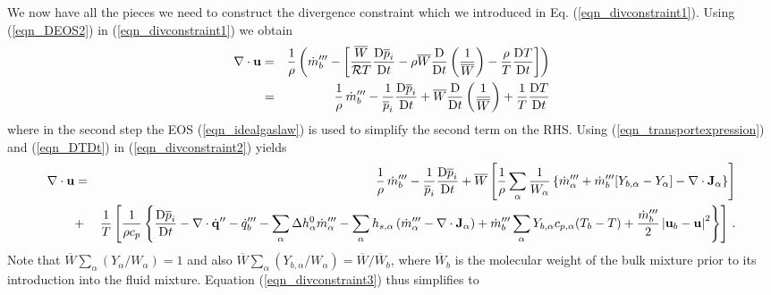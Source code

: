 We now have all the pieces we need to construct the divergence constraint which we introduced in Eq. (\ref{eqn_divconstraint1}).  Using (\ref{eqn_DEOS2}) in (\ref{eqn_divconstraint1}) we obtain
\begin{eqnarray}
\label{eqn_divconstraint2}
\Div\mathbf{u} &=& \frac{1}{\rho} \left( \dot{m}_b^{\tripleprime} -  \left[ \frac{\overline{W}}{\mathcal{R}T} \frac{\mbox{D}\overline{p}_i}{\mbox{D} t} -
\rho \overline{W} \frac{\mbox{D}}{\mbox{D} t}\left(\frac{1}{\overline{W}}\right) - \frac{\rho}{T} \frac{\mbox{D} T}{\mbox{D} t} \right] \right)  \nonumber \vspace{0.3cm} \\
&=& \frac{1}{\rho} \,\dot{m}_b^{\tripleprime} -  \frac{1}{\overline{p}_i} \frac{\mbox{D}\overline{p}_i}{\mbox{D} t} + \overline{W} \frac{\mbox{D}}{\mbox{D} t}\left(\frac{1}{\overline{W}}\right) +
\frac{1}{T} \frac{\mbox{D} T}{\mbox{D} t}
\end{eqnarray}
where in the second step the EOS (\ref{eqn_idealgaslaw}) is used to simplify the second term on the RHS.
Using (\ref{eqn_transportexpression}) and (\ref{eqn_DTDt}) in (\ref{eqn_divconstraint2}) yields
\begin{eqnarray}
\label{eqn_divconstraint3}
\Div\mathbf{u} &=& \frac{1}{\rho} \,\dot{m}_b^{\tripleprime} -  \frac{1}{\overline{p}_i} \frac{\mbox{D}\overline{p}_i}{\mbox{D} t} + \overline{W} \left[\frac{1}{\rho} \sum_\alpha \frac{1}{W_\alpha} \left\{  \dot{m}_\alpha^{\tripleprime} + \dot{m}_{b}^{\tripleprime}[Y_{b,\alpha} - Y_\alpha] - \Div \mathbf{J}_{\alpha} \right\} \right] \nonumber \vspace{0.3cm}\\
&+&  \frac{1}{T} \left[ \frac{1}{\rho c_p} \left\{ \frac{\mbox{D} \overline{p}_i }{\mbox{D} t} - \Div\dot{\mathbf{q}}^{\prime\prime} -\dq_b''' - \sum_\alpha \Delta h^0_\alpha \dot{m}_\alpha^{\tripleprime} - \sum_\alpha h_{s,\alpha}\left(  \dot{m}_\alpha^{\tripleprime} - \Div \mathbf{J}_{\alpha} \right) + \dot{m}_{b}^{\tripleprime} \sum_\alpha Y_{b,\alpha} c_{p,\alpha}(T_b-T) + \frac{\dot{m}_{b}^{\tripleprime}}{2}\left|\mathbf{u}_b-\mathbf{u}\right|^2 \right\} \right] \,\mbox{.} \nonumber \vspace{0.3cm}\\
\end{eqnarray}
Note that $\overline{W} \sum_\alpha (Y_\alpha/W_\alpha) = 1$ and also $\overline{W} \sum_\alpha (Y_{b,\alpha}/W_\alpha) = \overline{W}/\overline{W}_b$,
where $\overline{W}_b$ is the molecular weight of the bulk mixture prior to its introduction into the fluid mixture.  Equation (\ref{eqn_divconstraint3}) thus simplifies to
